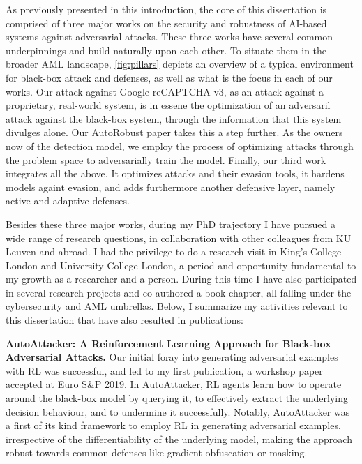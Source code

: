 As previously presented in this introduction, the core of this dissertation is comprised of three major works on the security and robustness of AI-based systems against adversarial attacks.
These three works have several common underpinnings and build naturally upon each other.
To situate them in the broader \gls{AML} landscape, \autoref{fig:pillars} depicts an overview of a typical environment for black-box attack and defenses, as well as what is the focus in each of our works.
Our attack against Google reCAPTCHA v3, as an attack against a proprietary, real-world system, is in essene the optimization of an adversaril attack against the black-box system, through the information that this system divulges alone.
Our AutoRobust paper takes this a step further.
As the owners now of the detection model, we employ the process of optimizing attacks through the problem space to adversarially train the model.
Finally, our third work integrates all the above.
It optimizes attacks and their evasion tools, it hardens models againt evasion, and adds furthermore another defensive layer, namely active and adaptive defenses.

Besides these three major works, during my PhD trajectory I have pursued a wide range of research questions, in collaboration with other colleagues from KU Leuven and abroad.
I had the privilege to do a research visit in King's College London and University College London, a period and opportunity fundamental to my growth as a researcher and a person.
During this time I have also participated in several research projects and co-authored a book chapter, all falling under the cybersecurity and \gls{AML} umbrellas.
Below, I summarize my activities relevant to this dissertation that have also resulted in publications:

\textbf{AutoAttacker: A Reinforcement Learning Approach for Black-box Adversarial Attacks.}
Our initial foray into generating adversarial examples with \gls{RL} was successful, and led to my first publication, a workshop paper accepted at Euro S\&P 2019.
In AutoAttacker, \gls{RL} agents learn how to operate around the black-box model by querying it, to effectively extract the underlying decision behaviour, and to undermine it successfully.
Notably, AutoAttacker was a first of its kind framework to employ \gls{RL} in generating adversarial examples, irrespective of the differentiability of the underlying model, making the approach robust towards common defenses like gradient obfuscation or masking.

\begin{myleftbar}
\end{myleftbar}

